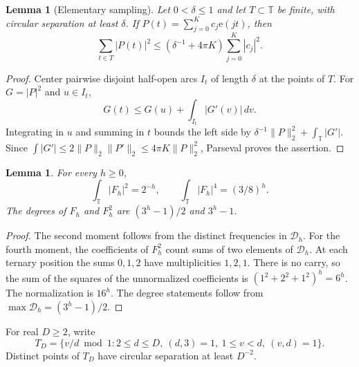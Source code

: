 \documentclass[11pt]{article}
\newtheorem{lemma}[theorem]{Lemma}
\theoremstyle{remark}
\newcommand{\D}{\mathcal D}
\newcommand{\T}{\mathbb T}
\newcommand{\ee}[1]{\mathrm e(#1)}
\begin{document}
\begin{lemma}[Elementary sampling]\label{count:lem:sampling}
Let $0<\delta\le1$ and let $T\subset\T$ be finite, with circular
separation at least $\delta$.
If $P(t)=\sum_{j=0}^K c_j\ee{jt}$, then
\[
 \sum_{t\in T}|P(t)|^2
 \le (\delta^{-1}+4\pi K)\sum_{j=0}^K|c_j|^2.
\]
\end{lemma}
\begin{proof}
Center pairwise disjoint half-open arcs $I_t$ of length $\delta$ at the
points of $T$. For $G=|P|^2$ and $u\in I_t$,
\[
 G(t)\le G(u)+\int_{I_t}|G'(v)|\,dv.
\]
Integrating in $u$ and summing in $t$ bounds the left side by
$\delta^{-1}\|P\|_2^2+\int_\T|G'|$.
Since $\int|G'|\le2\|P\|_2\|P'\|_2\le4\pi K\|P\|_2^2$,
Parseval proves the assertion.
\end{proof}

\begin{lemma}\label{count:lem:moments}
For every $h\ge0$,
\[
 \int_\T|F_h|^2=2^{-h},\qquad
 \int_\T|F_h|^4=(3/8)^h.
\]
The degrees of $F_h$ and $F_h^2$ are $(3^h-1)/2$ and $3^h-1$.
\end{lemma}
\begin{proof}
The second moment follows from the distinct frequencies in $\D_h$.
For the fourth moment, the coefficients of $F_h^2$ count sums of two
elements of $\D_h$. At each ternary position the sums $0,1,2$ have
multiplicities $1,2,1$. There is no carry, so the sum of the squares
of the unnormalized coefficients is $(1^2+2^2+1^2)^h=6^h$.
The normalization is $16^h$. The degree statements follow from
$\max\D_h=(3^h-1)/2$.
\end{proof}

For real $D\ge2$, write
\[
 T_D=\{v/d\bmod1:2\le d\le D,\ (d,3)=1,
                       \ 1\le v<d,\ (v,d)=1\}.
\]
Distinct points of $T_D$ have circular separation at least $D^{-2}$.
\end{document}

